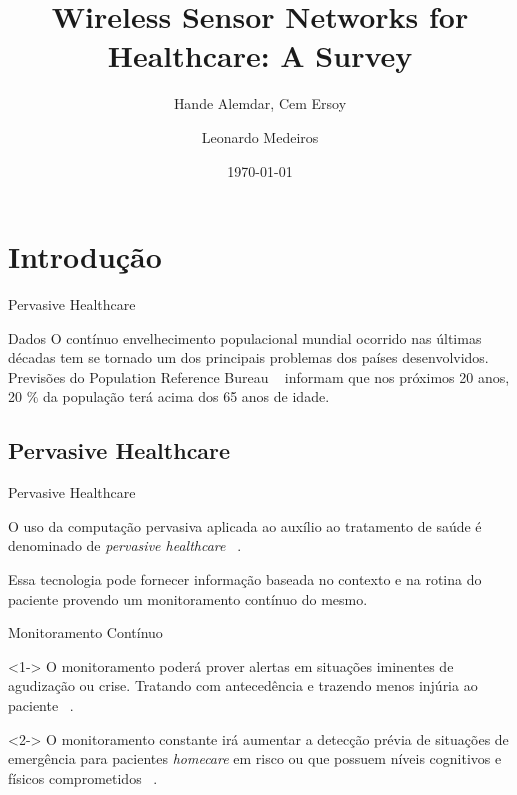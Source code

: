 \documentclass{beamer}
\author[L. Medeiros]{Leonardo Medeiros}
\date{\today}
\institute[IFAL, UFCG, UFAL]{IFAL, UFCG, UFAL}
\title{Wireless Sensor Networks for Healthcare: A Survey}
\subtitle{Hande Alemdar, Cem Ersoy}
\begin{document}
\begin{frame}
  \titlepage
\end{frame}

{
}

\section{Introdução}
\begin{frame}{Pervasive Healthcare}
  \begin{block}{Dados}
  O contínuo envelhecimento populacional mundial ocorrido nas últimas décadas tem se tornado um dos principais problemas dos países desenvolvidos. Previsões do Population Reference Bureau ~\cite{aging05} informam que nos próximos 20 anos, 20 $\%$ da população terá acima dos 65 anos de idade.
  \end{block}
\end{frame}

\subsection{Pervasive Healthcare}
\begin{frame}{Pervasive Healthcare}
  \begin{block}{}
   O uso da computação pervasiva aplicada ao auxílio ao tratamento de saúde é denominado de \textit{pervasive healthcare} ~\cite{ah07}. 
  \end{block}

  \begin{block}{}
  Essa tecnologia pode fornecer informação baseada no contexto e na rotina do paciente provendo um monitoramento contínuo do mesmo. 
  \end{block}
\end{frame}

\begin{frame}{Monitoramento Contínuo} 
  \begin{block}{}<1->
   O monitoramento poderá prover alertas em situações iminentes de agudização ou crise. Tratando com antecedência e trazendo menos injúria ao paciente ~\cite{alemdar}.
  \end{block}
% 

  \begin{block}{}<2->
   O monitoramento constante irá aumentar a detecção prévia de situações de emergência para pacientes \textit{homecare} em risco ou que possuem níveis cognitivos e físicos comprometidos ~\cite{stan05}.
  \end{block}
\end{frame}
\end{document}
